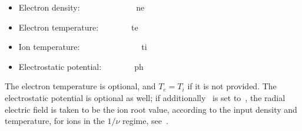 \begin{itemize}
\item Electron density: ~~~~~~~~~~~~~{\ttfamily ne} 
\item Electron temperature:~~~~~~~~{\ttfamily te} 
\item Ion temperature:~~~~~~~~~~~~~~~{\ttfamily ti} 
\item Electrostatic potential:~~~~~~~~{\ttfamily ph}
\end{itemize}

The electron temperature is optional, and $T_e=T_i$ if it is not provided. The electrostatic potential is optional as well; if additionally~ is set to~\false, the radial electric field is taken to be the ion root value, according to the input density and temperature, for ions in the $1/\nu$ regime, see~.

\

